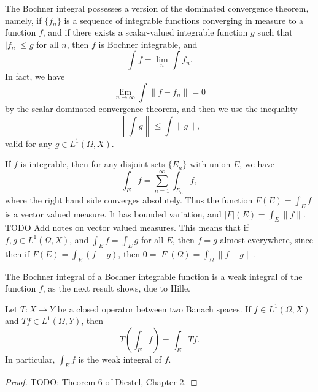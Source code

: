 The Bochner integral possesses a version of the dominated convergence theorem, namely, if $\{ f_n \}$ is a sequence of integrable functions converging in measure to a function $f$, and if there exists a scalar-valued integrable function $g$ such that $|f_n| \leq g$ for all $n$, then $f$ is Bochner integrable, and
%
\[ \int f = \lim_n \int f_n. \]
%
In fact, we have
%
\[ \lim_{n \to \infty} \int \| f - f_n \| = 0 \]
%
by the scalar dominated convergence theorem, and then we use the inequality
%
\[ \left\| \int g \right\| \leq \int \| g \|, \]
%
valid for any $g \in L^1(\Omega,X)$.

If $f$ is integrable, then for any disjoint sets $\{ E_n \}$ with union $E$, we have
%
\[ \int_E f = \sum_{n = 1}^\infty \int_{E_n} f, \]
%
where the right hand side converges absolutely. Thus the function $F(E) = \int_E f$ is a vector valued measure. It has bounded variation, and $|F|(E) = \int_E \| f \|$. TODO Add notes on vector valued measures. This means that if $f,g \in L^1(\Omega,X)$, and $\int_E f = \int_E g$ for all $E$, then $f = g$ almost everywhere, since then if $F(E) = \int_E (f - g)$, then $0 = |F|(\Omega) = \int_\Omega \| f - g \|$.

The Bochner integral of a Bochner integrable function is a weak integral of the function $f$, as the next result shows, due to Hille.

\begin{theorem}
    Let $T: X \to Y$ be a closed operator between two Banach spaces. If $f \in L^1(\Omega,X)$ and $Tf \in L^1(\Omega,Y)$, then
    \[ T \left( \int_E f \right) = \int_E Tf. \]
    In particular, $\int_E f$ is the weak integral of $f$.
\end{theorem}
\begin{proof}
    TODO: Theorem 6 of Diestel, Chapter 2.
\end{proof}

